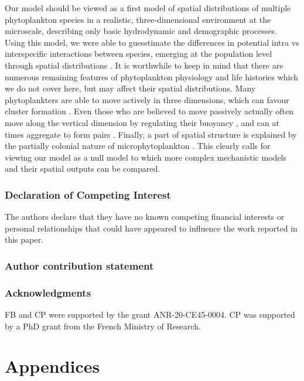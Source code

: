 \documentclass[english]{article}
\begin{document}
Our model should be viewed as a first model of spatial distributions
of multiple phytoplankton species in a realistic, three-dimensional
environment at the microscale, describing only basic hydrodynamic
and demographic processes. Using this model, we were able to guesstimate
the differences in potential intra vs interspecific interactions between
species, emerging at the population level through spatial distributions
\citep{detto_stabilization_2016}. It is worthwhile to keep in mind
that there are numerous remaining features of phytoplankton physiology
and life histories which we do not cover here, but may affect their
spatial distributions. Many phytoplankters are able to move actively
in three dimensions, which can favour cluster formation \citep{breier_emergence_2018}.
Even those who are believed to move passively actually often move
along the vertical dimension by regulating their buoyancy \citep{reynolds2006ecology},
and can at times aggregate to form pairs \citep{font-munoz_collective_2019}.
Finally, a part of spatial structure is explained by the partially
colonial nature of microphytoplankton \citep{kiorboe_coagulation_1990}.
This clearly calls for viewing our model as a null model to which
more complex mechanistic models and their spatial outputs can be compared.

\subsubsection*{Declaration of Competing Interest}

The authors declare that they have no known competing financial interests
or personal relationships that could have appeared to influence the
work reported in this paper.

\subsubsection*{Author contribution statement}

\subsubsection*{Acknowledgments}

FB and CP were supported by the grant ANR-20-CE45-0004. CP was supported
by a PhD grant from the French Ministry of Research.

\section*{Appendices}
\end{document}
